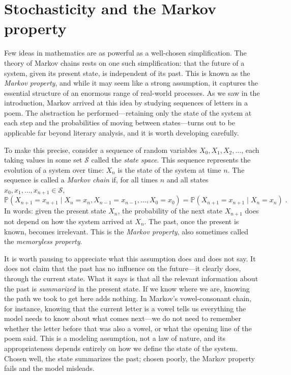 \section{Stochasticity and the Markov property}

Few ideas in mathematics are as powerful as a well-chosen simplification. The theory of Markov chains rests on one such simplification: that the future of a system, given its present state, is independent of its past. This is known as the \textit{Markov property}, and while it may seem like a strong assumption, it captures the essential structure of an enormous range of real-world processes. As we saw in the introduction, Markov arrived at this idea by studying sequences of letters in a poem. The abstraction he performed---retaining only the state of the system at each step and the probabilities of moving between states---turns out to be applicable far beyond literary analysis, and it is worth developing carefully.

\medskip

To make this precise, consider a sequence of random variables $X_0, X_1, X_2, \dots$, each taking values in some set $\mathcal{S}$ called the \textit{state space}. This sequence represents the evolution of a system over time: $X_n$ is the state of the system at time $n$. The sequence is called a \textit{Markov chain} if, for all times $n$ and all states $x_0, x_1, \dots, x_{n+1} \in \mathcal{S}$,
\begin{equation}
    \mathbb{P}(X_{n+1} = x_{n+1} \mid X_n = x_n, X_{n-1} = x_{n-1}, \dots, X_0 = x_0) = \mathbb{P}(X_{n+1} = x_{n+1} \mid X_n = x_n) \; .
    \label{eq:markov_property}
\end{equation}
In words: given the present state $X_n$, the probability of the next state $X_{n+1}$ does not depend on how the system arrived at $X_n$. The past, once the present is known, becomes irrelevant. This is the \textit{Markov property}, also sometimes called the \textit{memoryless property}.

\medskip

It is worth pausing to appreciate what this assumption does and does not say. It does not claim that the past has no influence on the future---it clearly does, through the current state. What it says is that all the relevant information about the past is \textit{summarized} in the present state. If we know where we are, knowing the path we took to get here adds nothing. In Markov's vowel-consonant chain, for instance, knowing that the current letter is a vowel tells us everything the model needs to know about what comes next---we do not need to remember whether the letter before that was also a vowel, or what the opening line of the poem said. This is a modeling assumption, not a law of nature, and its appropriateness depends entirely on how we define the state of the system. Chosen well, the state summarizes the past; chosen poorly, the Markov property fails and the model misleads.


